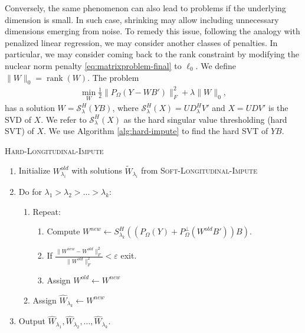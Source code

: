 \documentclass[preprint]{imsart}
\numberwithin{equation}{section}
\theoremstyle{plain}
\newcommand{\cS}{\mathcal{S}}
\DeclareMathOperator*{\rank}{rank}
\begin{document}

Conversely, the same phenomenon can also lead to problems if the underlying dimension is small. In such case, shrinking may allow including unnecessary dimensions emerging from noise. To remedy this issue, following the analogy with penalized linear regression, we may consider another classes of penalties. In particular, we may consider coming back to the rank constraint by modifying the nuclear norm penalty \eqref{eq:matrixproblem-final} to $\ell_0$. We define $\|W\|_0 = \rank(W)$. The problem
\begin{align}\label{eq:matrixproblem-final-l0}
\min_{W} \frac{1}{2} \|P_\Omega(Y - WB')\|_F^2 + \lambda\|W\|_0,
\end{align}
has a solution $W = \cS_\lambda^H (YB)$, where $\cS_\lambda^H(X) = UD_\lambda^H V'$ and $X = UDV'$ is the SVD of $X$. We refer to $\cS_\lambda^H(X)$ as the hard singular value thresholding (hard SVT) of $X$. We use Algorithm \ref{alg:hard-impute} to find the hard SVT of $YB$.



\begin{algorithm}
\caption{\textsc{Hard-Longitudinal-Impute}\label{alg:hard-impute}}
\begin{enumerate}
\item Initialize $W^{old}_{\lambda_i}$ with solutions $\tilde{W}_{\lambda_i}$ from \textsc{Soft-Longitudinal-Impute}
\item Do for $\lambda_1 > \lambda_2 > ... > \lambda_k$:
\begin{enumerate}
\item Repeat:
\begin{enumerate}
\item Compute $W^{new} \leftarrow S_{\lambda_k}^H( (P_\Omega(Y) + P_\Omega^\perp(W^{old}B'))B )$.
\item If $\frac{\|W^{new} - W^{old}\|_F^2}{\|W^{old}\|_F^2} < \varepsilon$ exit.
\item Assign $W^{old} \leftarrow W^{new}$
\end{enumerate}
\item Assign $\hat{W}_{\lambda_k} \leftarrow W^{new}$
\end{enumerate}
\item Output $\hat{W}_{\lambda_1}, \hat{W}_{\lambda_2}, ... , \hat{W}_{\lambda_k}$.
\end{enumerate}
\end{algorithm}
\end{document}
